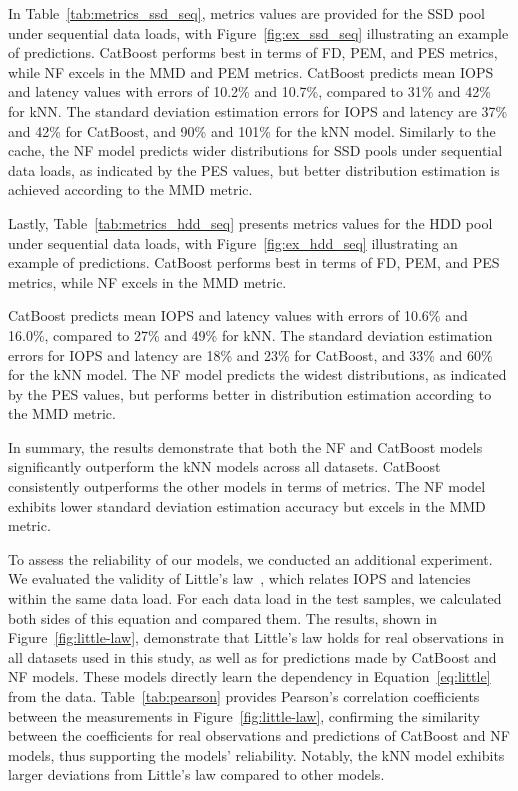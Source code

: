 In Table~\ref{tab:metrics_ssd_seq}, metrics values are provided for the SSD pool under sequential data loads, with Figure~\ref{fig:ex_ssd_seq} illustrating an example of predictions. CatBoost performs best in terms of FD, PEM, and PES metrics, while NF excels in the MMD and PEM metrics. CatBoost predicts mean IOPS and latency values with errors of 10.2\% and 10.7\%, compared to 31\% and 42\% for kNN. The standard deviation estimation errors for IOPS and latency are 37\% and 42\% for CatBoost, and 90\% and 101\% for the kNN model. Similarly to the cache, the NF model predicts wider distributions for SSD pools under sequential data loads, as indicated by the PES values, but better distribution estimation is achieved according to the MMD metric.

Lastly, Table~\ref{tab:metrics_hdd_seq} presents metrics values for the HDD pool under sequential data loads, with Figure~\ref{fig:ex_hdd_seq} illustrating an example of predictions. CatBoost performs best in terms of FD, PEM, and PES metrics, while NF excels in the MMD metric.

CatBoost predicts mean IOPS and latency values with errors of 10.6\% and 16.0\%, compared to 27\% and 49\% for kNN. The standard deviation estimation errors for IOPS and latency are 18\% and 23\% for CatBoost, and 33\% and 60\% for the kNN model. The NF model predicts the widest distributions, as indicated by the PES values, but performs better in distribution estimation according to the MMD metric.

In summary, the results demonstrate that both the NF and CatBoost models significantly outperform the kNN models across all datasets. CatBoost consistently outperforms the other models in terms of metrics. The NF model exhibits lower standard deviation estimation accuracy but excels in the MMD metric.

To assess the reliability of our models, we conducted an additional experiment. We evaluated the validity of Little's law~\cite{10.2307/167570}, which relates IOPS and latencies within the same data load. For each data load in the test samples, we calculated both sides of this equation and compared them. The results, shown in Figure~\ref{fig:little-law}, demonstrate that Little's law holds for real observations in all datasets used in this study, as well as for predictions made by CatBoost and NF models. These models directly learn the dependency in Equation~\ref{eq:little} from the data. 
Table~\ref{tab:pearson} provides Pearson's correlation coefficients between the measurements in Figure~\ref{fig:little-law}, confirming the similarity between the coefficients for real observations and predictions of CatBoost and NF models, thus supporting the models' reliability. Notably, the kNN model exhibits larger deviations from Little's law compared to other models.

